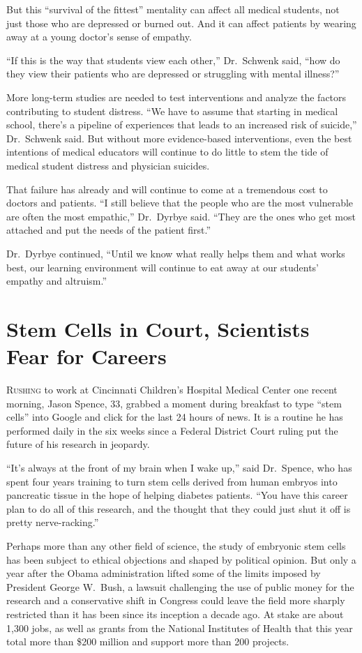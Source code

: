 ﻿\documentclass[12pt]{article}
\begin{document}
But this ``survival of the fittest'' mentality can affect all medical students, not just those who
are depressed or burned out. And it can affect patients by wearing away at a young doctor's sense of
empathy.

``If this is the way that students view each other,'' Dr.~Schwenk said, ``how do they view their
patients who are depressed or struggling with mental illness?''

More long-term studies are needed to test interventions and analyze the factors contributing to
student distress. ``We have to assume that starting in medical school, there's a pipeline of
experiences that leads to an increased risk of suicide,'' Dr.~Schwenk said. But without more
evidence-based interventions, even the best intentions of medical educators will continue to do
little to stem the tide of medical student distress and physician suicides.

That failure has already and will continue to come at a tremendous cost to doctors and patients. ``I
still believe that the people who are the most vulnerable are often the most empathic,'' Dr.~Dyrbye
said. ``They are the ones who get most attached and put the needs of the patient first.''

Dr.~Dyrbye continued, ``Until we know what really helps them and what works best, our learning
environment will continue to eat away at our students' empathy and altruism.''

\section{Stem Cells in Court, Scientists Fear for Careers}

\lettrine{R}{ushing} to work at Cincinnati Children's Hospital Medical
Center one recent morning, Jason Spence, 33, grabbed a moment during breakfast to type ``stem
cells'' into Google and click for the last 24 hours of news. It is a routine he has performed daily
in the six weeks since a Federal District Court ruling put the future of his research in jeopardy.

``It's always at the front of my brain when I wake up,'' said Dr.~Spence, who has spent four years
training to turn stem cells derived from human embryos into pancreatic tissue in the hope of helping
diabetes patients. ``You have this career plan to do all of this research, and the thought that they
could just shut it off is pretty nerve-racking.''

Perhaps more than any other field of science, the study of embryonic stem cells has been subject to
ethical objections and shaped by political opinion. But only a year after the Obama administration
lifted some of the limits imposed by President George W.~Bush, a lawsuit challenging the use of
public money for the research and a conservative shift in Congress could leave the field more
sharply restricted than it has been since its inception a decade ago. At stake are about 1,300 jobs,
as well as grants from the National Institutes of Health that this year total more than \$200
million and support more than 200 projects.
\end{document}
